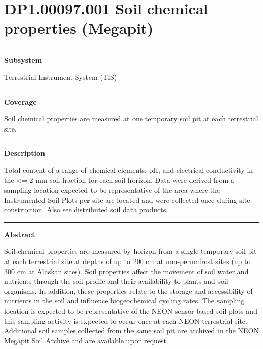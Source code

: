 \documentclass[]{article}
\begin{document}
\section{DP1.00097.001 Soil chemical properties
(Megapit)}\label{dp1.00097.001-soil-chemical-properties-megapit}

\begin{center}\rule{0.5\linewidth}{\linethickness}\end{center}

\textbf{Subsystem}

Terrestrial Instrument System (TIS)

\begin{center}\rule{0.5\linewidth}{\linethickness}\end{center}

\textbf{Coverage}

Soil chemical properties are measured at one temporary soil pit at each
terrestrial site.

\begin{center}\rule{0.5\linewidth}{\linethickness}\end{center}

\textbf{Description}

Total content of a range of chemical elements, pH, and electrical
conductivity in the \textless{}= 2 mm soil fraction for each soil
horizon. Data were derived from a sampling location expected to be
representative of the area where the Instrumented Soil Plots per site
are located and were collected once during site construction. Also see
distributed soil data products.

\begin{center}\rule{0.5\linewidth}{\linethickness}\end{center}

\textbf{Abstract}

Soil chemical properties are measured by horizon from a single temporary
soil pit at each terrestrial site at depths of up to 200 cm at
non-permafrost sites (up to 300 cm at Alaskan sites). Soil properties
affect the movement of soil water and nutrients through the soil profile
and their availability to plants and soil organisms. In addition, these
properties relate to the storage and accessibility of nutrients in the
soil and influence biogeochemical cycling rates. The sampling location
is expected to be representative of the NEON sensor-based soil plots and
this sampling activity is expected to occur once at each NEON
terrestrial site. Additional soil samples collected from the same soil
pit are archived in the
\href{http://www.neonscience.org/request-megapit-soil-samples}{NEON
Megapit Soil Archive} and are available upon request.
\end{document}
